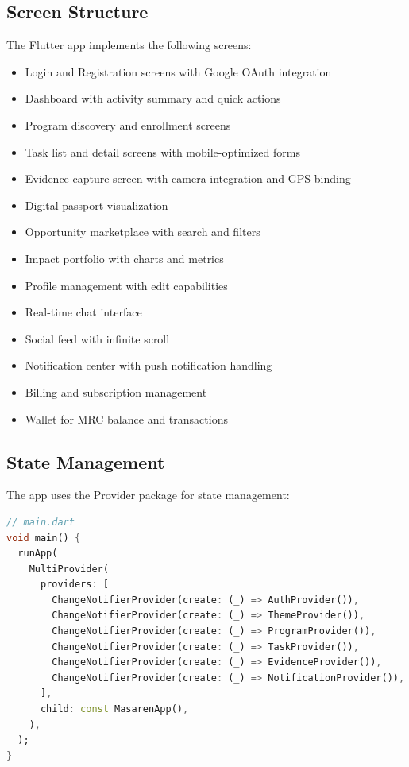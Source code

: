 \subsection{Screen Structure}

The Flutter app implements the following screens:
\begin{itemize}
  \item Login and Registration screens with Google OAuth integration
  \item Dashboard with activity summary and quick actions
  \item Program discovery and enrollment screens
  \item Task list and detail screens with mobile-optimized forms
  \item Evidence capture screen with camera integration and GPS binding
  \item Digital passport visualization
  \item Opportunity marketplace with search and filters
  \item Impact portfolio with charts and metrics
  \item Profile management with edit capabilities
  \item Real-time chat interface
  \item Social feed with infinite scroll
  \item Notification center with push notification handling
  \item Billing and subscription management
  \item Wallet for MRC balance and transactions
\end{itemize}

\subsection{State Management}

The app uses the Provider package for state management:

\begin{lstlisting}[language=Dart, caption=Provider Setup]
// main.dart
void main() {
  runApp(
    MultiProvider(
      providers: [
        ChangeNotifierProvider(create: (_) => AuthProvider()),
        ChangeNotifierProvider(create: (_) => ThemeProvider()),
        ChangeNotifierProvider(create: (_) => ProgramProvider()),
        ChangeNotifierProvider(create: (_) => TaskProvider()),
        ChangeNotifierProvider(create: (_) => EvidenceProvider()),
        ChangeNotifierProvider(create: (_) => NotificationProvider()),
      ],
      child: const MasarenApp(),
    ),
  );
}
\end{lstlisting}

